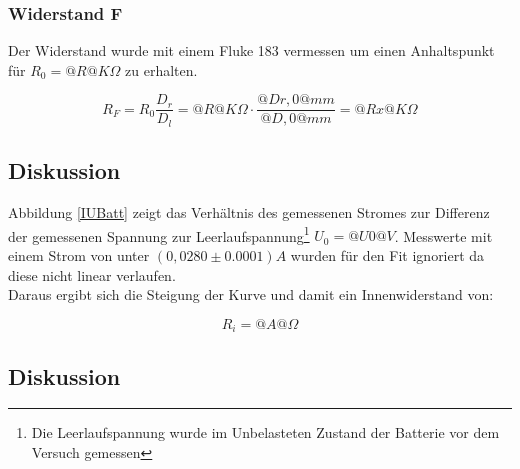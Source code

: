 \documentclass{article}
\begin{document}
\subsubsection{Widerstand F}

Der Widerstand wurde mit einem Fluke 183 vermessen um einen
Anhaltspunkt für $R_0=@R@K\Omega$ zu erhalten.

$$R_F=R_0\frac{D_r}{D_l}=@R@ K\Omega \cdot \frac{@Dr,0@ mm}{@D,0@ mm} = @Rx@ K\Omega$$


\subsection{Diskussion}


Abbildung \ref{IUBatt} zeigt das Verhältnis des gemessenen Stromes zur
Differenz der gemessenen Spannung zur Leerlaufspannung\footnote{Die Leerlaufspannung
wurde im Unbelasteten Zustand der Batterie vor dem Versuch gemessen}
$U_0=@U0@V$. Messwerte mit einem Strom von unter $(0,0280\pm 0.0001) A$ wurden für den
Fit ignoriert da diese nicht linear verlaufen. \\

Daraus ergibt sich die Steigung der Kurve und damit ein Innenwiderstand von:

$$R_i=@A@ \Omega$$

\subsection{Diskussion}
\end{document}
